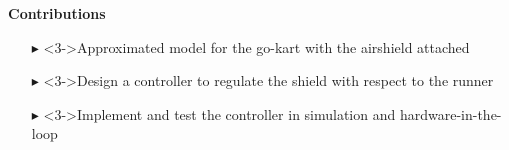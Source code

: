 \documentclass[9pt, aspectratio=169]{beamer}
\begin{document}
\begin{frame}
 \textcolor{emph@Thesis}{\textbf{\small{Contributions}}} \\
\vspace{0.1cm}
\footnotesize
\begin{itemize}
	\footnotesize
	\item[$\blacktriangleright$] <3->Approximated model for the go-kart with the airshield attached
	\item[$\blacktriangleright$] <3->Design a controller to regulate the shield with respect to the runner
	\item[$\blacktriangleright$] <3->Implement and test the controller in simulation and hardware-in-the-loop
\end{itemize}
\end{frame}


\end{document}
